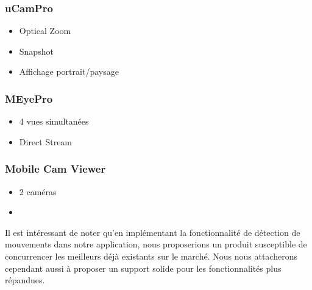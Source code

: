 \subsubsection{uCamPro}
\begin{itemize}
  \item Optical Zoom
  \item Snapshot
  \item Affichage portrait/paysage
\end{itemize}

\subsubsection{MEyePro}
\begin{itemize}
  \item 4 vues simultanées
  \item Direct Stream
\end{itemize}


\subsubsection{Mobile Cam Viewer}
\begin{itemize}
  \item 2 caméras
  \item
\end{itemize}

Il est intéressant de noter qu'en implémentant la fonctionnalité de détection de
mouvements dans notre application, nous proposerions un produit susceptible de
concurrencer les meilleurs déjà existants sur le marché. Nous nous attacherons
cependant aussi à proposer un support solide pour les fonctionnalités plus
répandues.

\clearpage